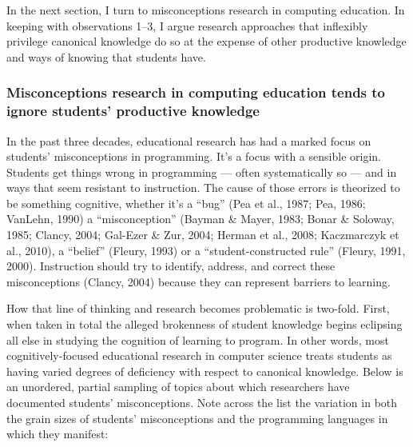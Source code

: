 In the next section, I turn to misconceptions research in computing
education. In keeping with observations 1--3, I argue research
approaches that inflexibly privilege canonical knowledge do so at the
expense of other productive knowledge and ways of knowing that students
have.

\subsubsection{Misconceptions research in computing education tends to
ignore students' productive
knowledge}\label{misconceptions-research-in-computing-education-tends-to-ignore-students-productive-knowledge}

In the past three decades, educational research has had a marked focus
on students' misconceptions in programming. It's a focus with a sensible
origin. Students get things wrong in programming --- often
systematically so --- and in ways that seem resistant to instruction.
The cause of those errors is theorized to be something cognitive,
whether it's a ``bug'' (Pea et al., 1987; Pea, 1986; VanLehn, 1990) a
``misconception'' (Bayman \& Mayer, 1983; Bonar \& Soloway, 1985;
Clancy, 2004; Gal-Ezer \& Zur, 2004; Herman et al., 2008; Kaczmarczyk et
al., 2010), a ``belief'' (Fleury, 1993) or a ``student-constructed
rule'' (Fleury, 1991, 2000). Instruction should try to identify,
address, and correct these misconceptions (Clancy, 2004) because they
can represent barriers to learning.

How that line of thinking and research becomes problematic is two-fold.
First, when taken in total the alleged brokenness of student knowledge
begins eclipsing all else in studying the cognition of learning to
program. In other words, most cognitively-focused educational research
in computer science treats students as having varied degrees of
deficiency with respect to canonical knowledge. Below is an unordered,
partial sampling of topics about which researchers have documented
students' misconceptions. Note across the list the variation in both the
grain sizes of students' misconceptions and the programming languages in
which they manifest:


